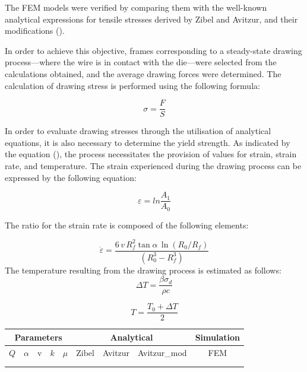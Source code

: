 \documentclass[subscriptcorrection,upint,varvw,barcolor=Goldenrod3,mathalfa=cal=euler,balance,hyphenate,french,pdf-a]{asmejour} %
\begin{document}
The FEM  models  were verified by comparing them with the well-known analytical expressions for tensile stresses derived by Zibel and Avitzur, and their modifications ().

In order to achieve this objective, frames corresponding to a steady-state drawing process—where the wire is in contact with the die—were selected from the calculations obtained, and the average drawing forces were determined. The calculation of drawing stress is performed using the following formula:

\begin{equation}
\sigma =\frac{F}{S}  
\end{equation}

In order to evaluate drawing stresses through the utilisation of analytical equations, it is also necessary to determine the yield strength. As indicated by the equation (), the process necessitates the provision of values for strain, strain rate, and temperature. The strain experienced during the drawing process can be expressed by the following equation:

\begin{equation}
\varepsilon =ln\frac{A_{1}}{A_{0}}  
\end{equation}

The ratio for the strain rate is composed of the following elements:

\begin{equation}
\dot\varepsilon = \frac{6\,v\,R_f^2\tan\alpha\,\ln(R_0/R_f)}{(R_0^3-R_f^3)}  
\end{equation}
The temperature resulting from the drawing process is estimated as follows:
\begin{equation}
\Delta T = \frac{\beta \sigma_d}{\rho c}
\end{equation}

\begin{equation}
T = \frac{T_{0} + \Delta T}{2}
\end{equation}


\begin{table}[h!]
\centering
\renewcommand{\arraystretch}{1.5} 
\begin{tabular}{ccccccccc}
\hline
\multicolumn{5}{c}{Parameters} & \multicolumn{3}{c}{Analytical} & Simulation \\ \hline
$Q$ & $\alpha$ & v & $k$ & $\mu$ & Zibel & Avitzur & Avitzur_{mod} & FEM \\ \hline
 & & & & & & & & \\ \hline
 & & & & & & & & \\ \hline
\end{tabular}
\end{table}
\label{sec:res_fem_verification}
\end{document}
